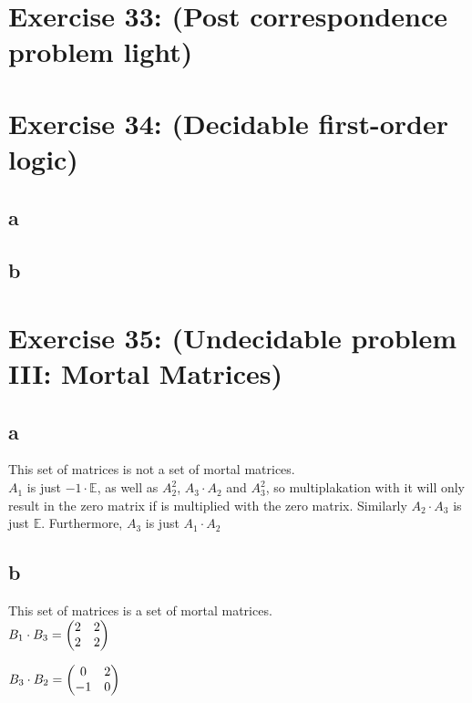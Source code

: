 \documentclass[12pt]{article}
\begin{document}
 

\rhead{\today}


\section*{Exercise 33: (Post correspondence problem light)}

\section*{Exercise 34: (Decidable first-order logic)}
\subsection*{a}
\subsection*{b}

\section*{Exercise 35: (Undecidable problem III: Mortal Matrices)}
\subsection*{a}
This set of matrices is not a set of mortal matrices.\\
$A_1$ is just $-1 \cdot \mathbb{E}$, as well as $A_2^2$, $A_3 \cdot A_2$ and $A_3^2$, so multiplakation with it will only result in the zero matrix if is multiplied with the zero matrix. Similarly $A_2 \cdot A_3$ is just $\mathbb{E}$. Furthermore, $A_3$ is just $A_1 \cdot A_2$

\subsection*{b}
This set of matrices is a set of mortal matrices.\\

$ B_1 \cdot B_3 =
\begin{pmatrix}
2 & 2 \\
2 & 2 
\end{pmatrix}\\
$

$
B_3 \cdot B_2 = 
\begin{pmatrix}
0 & 2 \\
-1 & 0 
\end{pmatrix}\\
$
\end{document}
